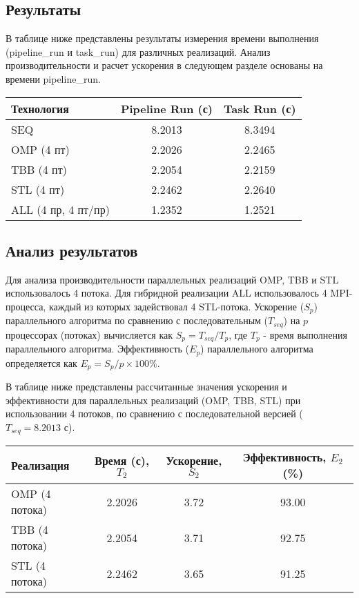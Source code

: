 \documentclass[12pt]{article}
\begin{document}
\subsection{Результаты}
В таблице ниже представлены результаты измерения времени выполнения (pipeline\_run и task\_run) для различных реализаций. Анализ производительности и расчет ускорения в следующем разделе основаны на времени pipeline\_run.

\begin{center}
\begin{tabular}{|l|c|c|}
\hline
\textbf{Технология} & \textbf{Pipeline Run (с)} & \textbf{Task Run (с)} \\
\hline
SEQ                    & 8.2013           & 8.3494       \\
\hline
OMP (4 пт)             & 2.2026           & 2.2465      \\
\hline
TBB (4 пт)             & 2.2054           & 2.2159       \\
\hline
STL (4 пт)             & 2.2462           & 2.2640       \\
\hline
ALL (4 пр, 4 пт/пр)    & 1.2352           & 1.2521       \\
\hline
\end{tabular}
\end{center}


\subsection{Анализ результатов}
Для анализа производительности параллельных реализаций OMP, TBB и STL использовалось 4 потока. Для гибридной реализации ALL использовалось 4 MPI-процесса, каждый из которых задействовал 4 STL-потока.
Ускорение ($S_p$) параллельного алгоритма по сравнению с последовательным ($T_{seq}$) на $p$ процессорах (потоках) вычисляется как $S_p = T_{seq} / T_p$, где $T_p$ - время выполнения параллельного алгоритма.
Эффективность ($E_p$) параллельного алгоритма определяется как $E_p = S_p / p \times 100\%$.

В таблице ниже представлены рассчитанные значения ускорения и эффективности для параллельных реализаций (OMP, TBB, STL) при использовании 4 потоков, по сравнению с последовательной версией ($T_{seq} = 8.2013$ с).

\begin{center}
\begin{tabular}{|l|c|c|c|}
\hline
\textbf{Реализация} & \textbf{Время (с), $T_2$} & \textbf{Ускорение, $S_2$} & \textbf{Эффективность, $E_2$ (\%)} \\
\hline
OMP (4 потока)    & 2.2026 & 3.72                 & 93.00 \\
\hline
TBB (4 потока)    & 2.2054 & 3.71                 & 92.75 \\
\hline
STL (4 потока)    & 2.2462 & 3.65                 & 91.25 \\
\hline
\end{tabular}
\end{center}
\end{document}
